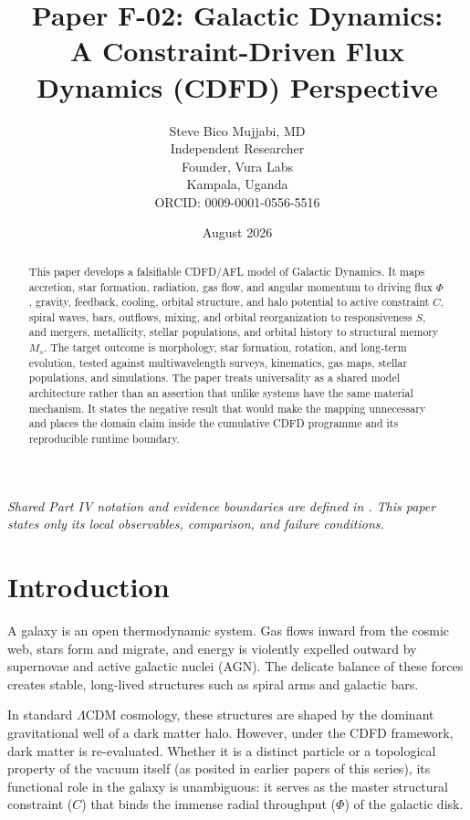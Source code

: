\documentclass[11pt,a4paper]{article}
\title{\textbf{Paper F-02: Galactic Dynamics:\\ A Constraint-Driven Flux Dynamics (CDFD) Perspective}}
\author{Steve Bico Mujjabi, MD\\
\small Independent Researcher\\
\small Founder, Vura Labs\\
\small Kampala, Uganda\\
\small ORCID: 0009-0001-0556-5516}
\date{August 2026}
\begin{document}
\maketitle

\noindent\textit{Shared Part IV notation and evidence boundaries are defined in . This paper states only its local observables, comparison, and failure conditions.}


\begin{abstract}
This paper develops a falsifiable CDFD/AFL model of Galactic Dynamics. It maps accretion, star formation, radiation, gas flow, and angular momentum to driving flux $\Phi$, gravity, feedback, cooling, orbital structure, and halo potential to active constraint $C$, spiral waves, bars, outflows, mixing, and orbital reorganization to responsiveness $S$, and mergers, metallicity, stellar populations, and orbital history to structural memory $M_s$. The target outcome is morphology, star formation, rotation, and long-term evolution, tested against multiwavelength surveys, kinematics, gas maps, stellar populations, and simulations. The paper treats universality as a shared model architecture rather than an assertion that unlike systems have the same material mechanism. It states the negative result that would make the mapping unnecessary and places the domain claim inside the cumulative CDFD programme and its reproducible runtime boundary.
\end{abstract}

\section{Introduction}

A galaxy is an open thermodynamic system. Gas flows inward from the cosmic web, stars form and migrate, and energy is violently expelled outward by supernovae and active galactic nuclei (AGN). The delicate balance of these forces creates stable, long-lived structures such as spiral arms and galactic bars.

In standard $\Lambda$CDM cosmology, these structures are shaped by the dominant gravitational well of a dark matter halo. However, under the CDFD framework, dark matter is re-evaluated. Whether it is a distinct particle or a topological property of the vacuum itself (as posited in earlier papers of this series), its functional role in the galaxy is unambiguous: it serves as the master structural constraint ($C$) that binds the immense radial throughput ($\Phi$) of the galactic disk.
\end{document}

